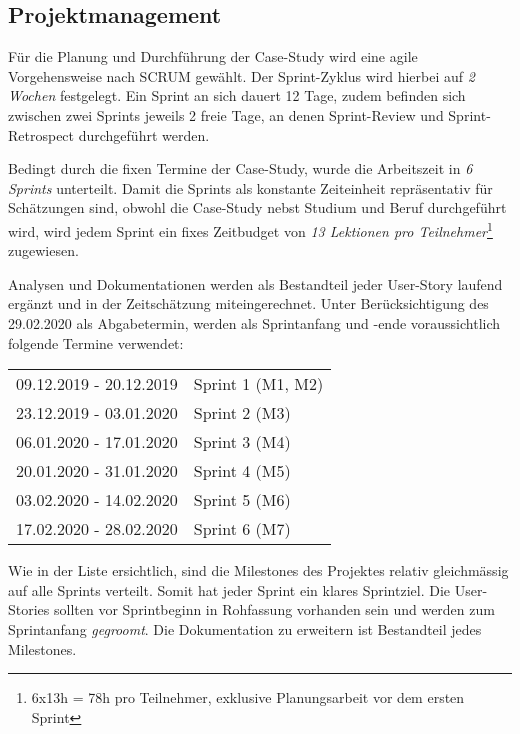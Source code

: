 \subsection{Projektmanagement}
Für die Planung und Durchführung der Case-Study wird eine agile Vorgehensweise nach SCRUM gewählt. Der Sprint-Zyklus wird hierbei auf \emph{2 Wochen} festgelegt. Ein Sprint an sich dauert 12 Tage, zudem befinden sich zwischen zwei Sprints jeweils 2 freie Tage, an denen Sprint-Review und Sprint-Retrospect durchgeführt werden.

Bedingt durch die fixen Termine der Case-Study, wurde die Arbeitszeit in \emph{6 Sprints} unterteilt. Damit die Sprints als konstante Zeiteinheit repräsentativ für Schätzungen sind, obwohl die Case-Study nebst Studium und Beruf durchgeführt wird, wird jedem Sprint ein fixes Zeitbudget von \emph{13 Lektionen pro Teilnehmer}\footnote{6x13h = 78h pro Teilnehmer, exklusive Planungsarbeit vor dem ersten Sprint} zugewiesen.

Analysen und Dokumentationen werden als Bestandteil jeder User-Story laufend ergänzt und in der Zeitschätzung miteingerechnet. Unter Berücksichtigung des 29.02.2020 als Abgabetermin, werden als Sprintanfang und -ende voraussichtlich folgende Termine verwendet:

\begin{center}
  \begin{tabular}{ l l } 
    09.12.2019 - 20.12.2019 & Sprint 1 (M1, M2) \\ 
    23.12.2019 - 03.01.2020 & Sprint 2 (M3) \\ 
    06.01.2020 - 17.01.2020 & Sprint 3 (M4) \\ 
    20.01.2020 - 31.01.2020 & Sprint 4 (M5) \\
    03.02.2020 - 14.02.2020 & Sprint 5 (M6) \\
    17.02.2020 - 28.02.2020 & Sprint 6 (M7) \\ 
  \end{tabular}
\end{center}

\noindent
Wie in der Liste ersichtlich, sind die Milestones des Projektes relativ gleichmässig auf alle Sprints verteilt. Somit hat jeder Sprint ein klares Sprintziel. Die User-Stories sollten vor Sprintbeginn in Rohfassung vorhanden sein und werden zum Sprintanfang \emph{gegroomt}. Die Dokumentation zu erweitern ist Bestandteil jedes Milestones.
